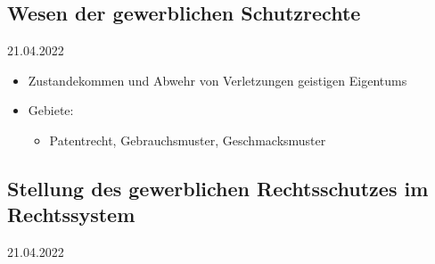 \documentclass{report}
\begin{document}
\subsection{Wesen der gewerblichen Schutzrechte}
21.04.2022
\begin{itemize}
	\item Zustandekommen und Abwehr von Verletzungen geistigen Eigentums
	\item Gebiete:
	\begin{itemize}
		\item Patentrecht, Gebrauchsmuster, Geschmacksmuster
	\end{itemize}
\end{itemize}

\subsection{Stellung des gewerblichen Rechtsschutzes im Rechtssystem}
21.04.2022
\end{document}

